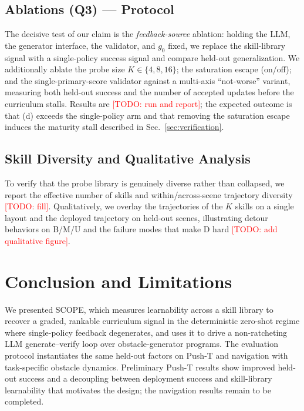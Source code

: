 \documentclass[conference]{IEEEtran}
\newcommand{\todo}[1]{\textcolor{red}{[TODO: #1]}}
\begin{document}
\subsection{Ablations (Q3) --- Protocol}
The decisive test of our claim is the \emph{feedback-source} ablation: holding the
LLM, the generator interface, the validator, and $g_0$ fixed, we replace the
skill-library signal with a single-policy success signal and compare held-out
generalization. We additionally ablate the probe size $K\!\in\!\{4,8,16\}$; the
saturation escape (on/off); and the single-primary-score validator against a multi-axis
``not-worse'' variant, measuring both held-out success and the number of accepted
updates before the curriculum stalls. Results are \todo{run and report}; the
expected outcome is that (d) exceeds the single-policy arm and that removing the
saturation escape induces the maturity stall described in
Sec.~\ref{sec:verification}.

\subsection{Skill Diversity and Qualitative Analysis}
To verify that the probe library is genuinely diverse rather than collapsed, we
report the effective number of skills and within/across-scene trajectory
diversity \todo{fill}. Qualitatively, we overlay the trajectories of the $K$
skills on a single layout and the deployed trajectory on held-out scenes,
illustrating detour behaviors on B/M/U and the failure modes that make D hard
\todo{add qualitative figure}.

\section{Conclusion and Limitations}
We presented SCOPE, which measures learnability across a skill library to recover a
graded, rankable curriculum signal in the deterministic zero-shot regime where
single-policy feedback degenerates, and uses it to drive a non-ratcheting LLM
generate--verify loop over obstacle-generator programs. The evaluation protocol
instantiates the same held-out factors on Push-T and navigation with
task-specific obstacle dynamics. Preliminary Push-T results show improved
held-out success and a decoupling between deployment success and skill-library
learnability that motivates the design; the navigation results remain to be
completed.
\end{document}

